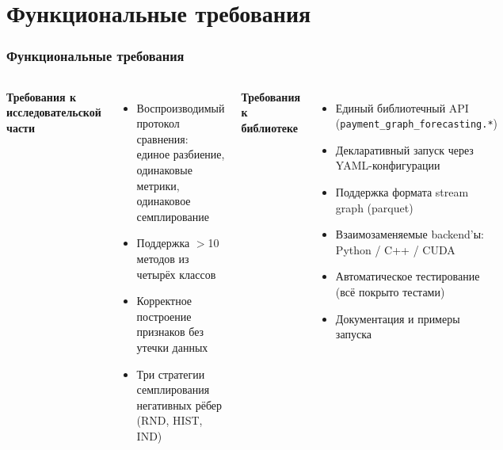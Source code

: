 \documentclass[aspectratio=169]{beamer}
\begin{document}
\section{Функциональные требования}
\begin{frame}
  \frametitle{Функциональные требования}
  \begin{columns}
    \textbf{Требования к исследовательской части}
    \begin{itemize}
      \item Воспроизводимый протокол сравнения: единое разбиение, одинаковые метрики, одинаковое семплирование
      \item Поддержка $>$10 методов из четырёх классов
      \item Корректное построение признаков без утечки данных
      \item Три стратегии семплирования негативных рёбер (RND, HIST, IND)
    \end{itemize}
    \textbf{Требования к библиотеке}
    \begin{itemize}
      \item Единый библиотечный API (\texttt{payment\_graph\_forecasting.*})
      \item Декларативный запуск через YAML-конфигурации
      \item Поддержка формата stream graph (parquet)
      \item Взаимозаменяемые backend'ы: Python / C++ / CUDA
      \item Автоматическое тестирование (всё покрыто тестами)
      \item Документация и примеры запуска
    \end{itemize}
  \end{columns}
\end{frame}

\end{document}
